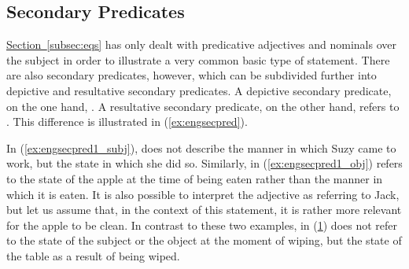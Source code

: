 \subsection{Secondary Predicates}
\label{subsec:secpred}

\hyperref[subsec:eqs]{Section~\ref*{subsec:eqs}} has only dealt with
predicative adjectives and nominals over the subject in order to illustrate a
very common basic type of statement. There are also secondary predicates,
however, which can be subdivided further into depictive and resultative
secondary predicates. A depictive secondary predicate, on the one hand,
. A resultative secondary predicate, on the other hand, refers to
. This difference is illustrated in (\ref{ex:engsecpred}).

\begin{figure}[h]
\pex\label{ex:engsecpred}
\a\label{ex:engsecpred1_subj}%

\a\label{ex:engsecpred1_obj}%

\a\label{ex:engsecpred2_obj}%
\xe
\end{figure}

In (\ref{ex:engsecpred1_subj}),  does not describe the manner in which
Suzy came to work, but the state in which she did so. Similarly,
 in (\ref{ex:engsecpred1_obj}) refers to the state of the apple at
the time of being eaten rather than the manner in which it is eaten. It is also
possible to interpret the adjective as referring to Jack, but let us assume
that, in the context of this statement, it is rather more relevant for the
apple to be clean. In contrast to these two examples,  in
(\ref{ex:engsecpred2_obj}) does not refer to the state of the subject or the
object at the moment of wiping, but the state of the table as a result of being
wiped.


